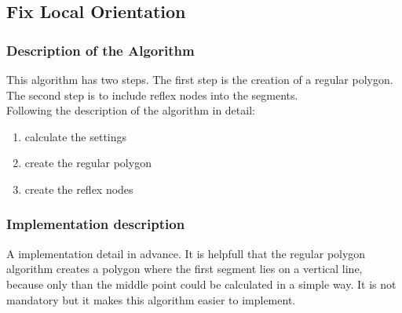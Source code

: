 \subsection{Fix Local Orientation}
\subsubsection{Description of the Algorithm}
This algorithm has two steps. The first step is the creation of a regular
polygon. The second step is to include reflex nodes into the segments.
\\[12pt]
Following the description of the algorithm in detail:

\begin{enumerate}
  \item calculate the settings
  \item create the regular polygon
  \item create the reflex nodes
\end{enumerate}

\subsubsection{Implementation description}
A implementation detail in advance. It is helpfull that the regular
polygon algorithm creates a polygon where the first segment lies on a
vertical line, because only than the middle point could be calculated
in a simple way. It is not mandatory but it makes this algorithm easier to
implement.

